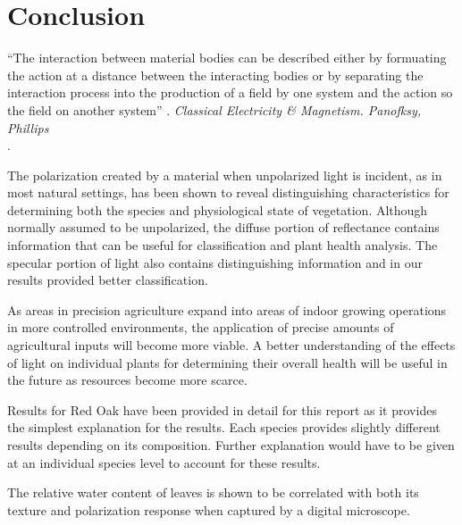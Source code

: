 \chapter{Conclusion}
\begin{center}
  \begin{minipage}{0.75\textwidth}
    \begin{small}
      “The interaction between material bodies can be described either by formuating the action at a distance between the interacting bodies or by separating the interaction process into the production of a field by one system and the action so the field on another system” .
      \emph{Classical Electricity \& Magnetism. Panofksy, Phillips}\\.
    \end{small}
  \end{minipage}
  \vspace{0.5cm}
\end{center}

The polarization created by a material when unpolarized light is incident, as in most natural settings, has been shown to reveal distinguishing characteristics for determining both the species and physiological state of vegetation.  Although normally assumed to be unpolarized, the diffuse portion of reflectance contains information that can be useful for classification and plant health analysis.  The specular portion of light also contains distinguishing information and in our results provided better classification.

As areas in precision agriculture expand into areas of indoor growing operations in more controlled environments, the application of precise amounts of agricultural inputs will become more viable.  A better understanding of the effects of light on individual plants for determining their overall health will be useful in the future as resources become more scarce.

Results for Red Oak have been provided in detail for this report as it provides the simplest explanation for the results.  Each species provides slightly different results depending on its composition.  Further explanation would have to be given at an individual species level to account for these results.

The relative water content of leaves is shown to be correlated with both its texture and polarization response when captured by a digital microscope.

